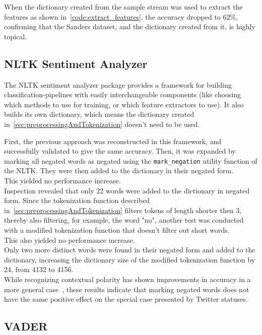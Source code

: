 When the dictionary created from the sample stream was used to extract the features as shown in~\ref{code:extract_features},
the accuracy dropped to $62\%$, confirming that the Sanders dataset, and the dictionary created from it, is highly topical.

\subsection{NLTK Sentiment Analyzer}
\label{subsec:nltksentimentanalyzer}

The NLTK sentiment analyzer package provides a framework for building classification-pipelines with easily interchangeable components
(like choosing which methods to use for training, or which feature extractors to use).
It also builds its own dictionary, which means the dictionary created in~\ref{sec:preprocessingAndTokenization} doesn't need to be used.
\par
First, the previous approach was reconstructed in this framework, and successfully validated to give the same accuracy.
Then, it was expanded by marking all negated words as negated using the \texttt{mark\_negation} utility function of the NLTK.
They were then added to the dictionary in their negated form.
\\
This yielded no performance increase.
\\
Inspection revealed that only 22 words were added to the dictionary in negated form.
Since the tokenization function described in~\ref{sec:preprocessingAndTokenization} filters tokens of length shorter then 3,
thereby also filtering, for example, the word "no", another test was conducted with a modified tokenization function that doesn't filter out short words.
\\
This also yielded no performance increase.
\\
Only two more distinct words were found in their negated form and added to the dictionary,
increasing the dictionary size of the modified tokenization function by 24, from 4132 to 4156.
\\
While recognizing contextual polarity has shown improvements in accuracy in a more general case~\cite{Hoffmann2005},
these results indicate that marking negated words does not have the same positive effect on the special case presented by Twitter statuses.

\subsection{VADER}
\label{subsec:vader}

